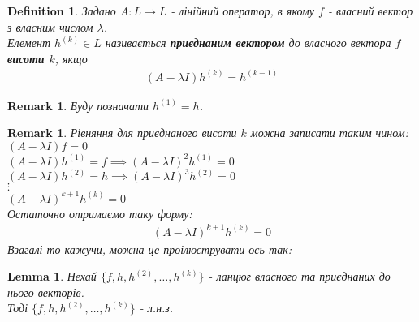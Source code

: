 \documentclass[a4paper, 10pt]{article}
\theoremstyle{theoremdd}
\theoremstyle{theoremdd}
\newtheorem{definition}[theorem]{Definition}
\theoremstyle{theoremdd}
\theoremstyle{theoremdd}
\theoremstyle{theoremdd}
\theoremstyle{theoremdd}
\newtheorem{remark}[theorem]{Remark}
\theoremstyle{theoremdd}
\newtheorem{lemma}[theorem]{Lemma}
\theoremstyle{theoremdd}
\begin{document}
\begin{definition}
Задано $A: L \to L$ - лінійний оператор, в якому $f$ - власний вектор з власним числом $\lambda$.\\
Елемент $h^{(k)} \in L$ називається \textbf{приєднаним вектором} до власного вектора $f$ \textbf{висоти $k$}, якщо
\begin{align*}
(A-\lambda I)h^{(k)} = h^{(k-1)}
\end{align*}
\end{definition}

\begin{remark}
Буду позначати $h^{(1)} = h$.
\end{remark}

\begin{remark}
Рівняння для приєднаного висоти $k$ можна записати таким чином:\\
$(A-\lambda I)f = 0$\\
$(A-\lambda I)h^{(1)} = f \implies (A-\lambda I)^2 h^{(1)} = 0$\\
$(A-\lambda I)h^{(2)} = h \implies (A-\lambda I)^3 h^{(2)} = 0$\\
$\vdots$\\
$(A-\lambda I)^{k+1}h^{(k)} = 0$\\
Остаточно отримаємо таку форму:
\begin{align*}
(A-\lambda I)^{k+1}h^{(k)} = 0
\end{align*}
Взагалі-то кажучи, можна це проілюструвати ось так:
\begin{figure}[H]
\centering
{}
\end{figure}
\end{remark}

\begin{lemma}
Нехай $\{f,h,h^{(2)},\dots,h^{(k)}\}$ - ланцюг власного та приєднаних до нього векторів.\\
Тоді $\{f,h,h^{(2)},\dots,h^{(k)}\}$ - л.н.з.
\end{lemma}
\end{document}
